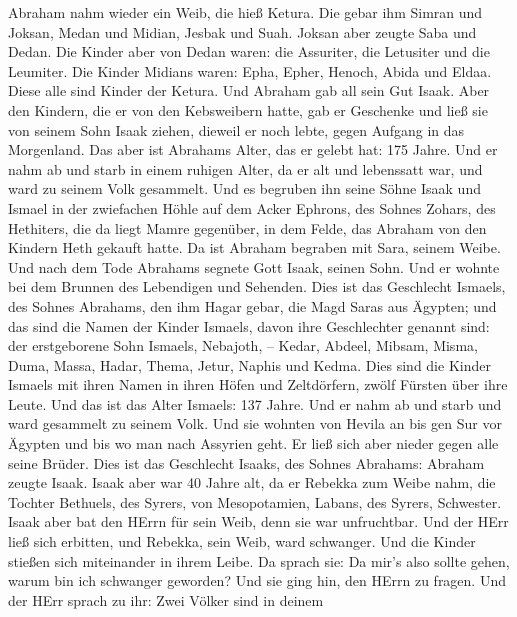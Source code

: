  Abraham nahm wieder ein Weib, die hieß Ketura. 
Die gebar ihm Simran und Joksan, Medan und Midian, Jesbak und Suah.
 Joksan aber zeugte Saba und Dedan. Die Kinder aber von
Dedan waren: die Assuriter, die Letusiter und die Leumiter. 
Die Kinder Midians waren: Epha, Epher, Henoch, Abida und Eldaa. Diese
alle sind Kinder der Ketura.  Und Abraham gab all sein Gut
Isaak.  Aber den Kindern, die er von den Kebsweibern hatte,
gab er Geschenke und ließ sie von seinem Sohn Isaak ziehen, dieweil er
noch lebte, gegen Aufgang in das Morgenland.  Das aber ist
Abrahams Alter, das er gelebt hat: 175 Jahre.  Und er nahm
ab und starb in einem ruhigen Alter, da er alt und lebenssatt war, und
ward zu seinem Volk gesammelt.  Und es begruben ihn seine
Söhne Isaak und Ismael in der zwiefachen Höhle auf dem Acker Ephrons,
des Sohnes Zohars, des Hethiters, die da liegt Mamre gegenüber,
 in dem Felde, das Abraham von den Kindern Heth gekauft
hatte. Da ist Abraham begraben mit Sara, seinem Weibe.  Und
nach dem Tode Abrahams segnete Gott Isaak, seinen Sohn. Und er wohnte
bei dem Brunnen des Lebendigen und Sehenden.  Dies ist das
Geschlecht Ismaels, des Sohnes Abrahams, den ihm Hagar gebar, die Magd
Saras aus Ägypten;  und das sind die Namen der Kinder
Ismaels, davon ihre Geschlechter genannt sind: der erstgeborene Sohn
Ismaels, Nebajoth, -- Kedar, Abdeel, Mibsam,  Misma, Duma,
Massa,  Hadar, Thema, Jetur, Naphis und Kedma.
 Dies sind die Kinder Ismaels mit ihren Namen in ihren
Höfen und Zeltdörfern, zwölf Fürsten über ihre Leute.  Und
das ist das Alter Ismaels: 137 Jahre. Und er nahm ab und starb und ward
gesammelt zu seinem Volk.  Und sie wohnten von Hevila an
bis gen Sur vor Ägypten und bis wo man nach Assyrien geht. Er ließ sich
aber nieder gegen alle seine Brüder.  Dies ist das
Geschlecht Isaaks, des Sohnes Abrahams: Abraham zeugte Isaak.
 Isaak aber war 40 Jahre alt, da er Rebekka zum Weibe nahm,
die Tochter Bethuels, des Syrers, von Mesopotamien, Labans, des Syrers,
Schwester.  Isaak aber bat den HErrn für sein Weib, denn
sie war unfruchtbar. Und der HErr ließ sich erbitten, und Rebekka, sein
Weib, ward schwanger.  Und die Kinder stießen sich
miteinander in ihrem Leibe. Da sprach sie: Da mir's also sollte gehen,
warum bin ich schwanger geworden? Und sie ging hin, den HErrn zu fragen.
 Und der HErr sprach zu ihr: Zwei Völker sind in deinem
